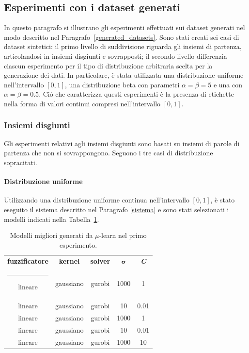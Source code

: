 \documentclass[12pt]{report}
\makeatletter
\theoremstyle{definition}
\newcommand{\thickhline}{%
    \noalign {\ifnum 0=`}\fi \hrule height 1pt
    \futurelet \reserved@a \@xhline
}
\makeatother
\begin{document}
\subsection{Esperimenti con i dataset generati}
In questo paragrafo si illustrano gli esperimenti effettuati sui dataset generati nel modo descritto nel Paragrafo~\ref{generated_datasets}. Sono stati creati sei casi di dataset sintetici: il primo livello di suddivisione riguarda gli insiemi di partenza, articolandosi in insiemi disgiunti e sovrapposti; il secondo livello differenzia ciascun esperimento per il tipo di distribuzione arbitraria scelta per la generazione dei dati. In particolare, è stata utilizzata una distribuzione uniforme nell'intervallo $[0,1]$, una distribuzione beta con parametri $\alpha = \beta = 5$ e una con $\alpha = \beta = 0.5$. Ciò che caratterizza questi esperimenti è la presenza di etichette nella forma di valori continui compresi nell'intervallo $[0,1]$.

\subsubsection{Insiemi disgiunti}\label{insiemidisgiunti}
Gli esperimenti relativi agli insiemi disgiunti sono basati su insiemi di parole di partenza che non si sovrappongono. Seguono i tre casi di distribuzione sopracitati.

\paragraph{Distribuzione uniforme} Utilizzando una distribuzione uniforme continua nell'intervallo $[0,1]$, è stato eseguito il sistema descritto nel Paragrafo \ref{sistema} e sono stati selezionati i modelli indicati nella Tabella~\ref{models_exp1}.
\begin{table}
\centering
\begin{adjustbox}{max width=\textwidth}
 \begin{tabular}{|c|c|c|c|c|} 
 \hline
\textbf{fuzzificatore} & \textbf{kernel} & \textbf{solver} & $\bm{\sigma}$ & \textit{\textbf{C}}
\\ [0.5ex] 
 \thickhline
 lineare & gaussiano & gurobi & 1000 & 1 \\
 lineare & gaussiano & gurobi & 10 & 0.01 \\
 lineare & gaussiano & gurobi & 1000 & 1 \\
 lineare & gaussiano & gurobi & 10 & 0.01 \\
 lineare & gaussiano & gurobi & 1000 & 10 \\
 \hline
\end{tabular}
\end{adjustbox}
\caption{Modelli migliori generati da $\mu$-learn nel primo esperimento.}
\label{models_exp1}
\end{table}
\end{document}
